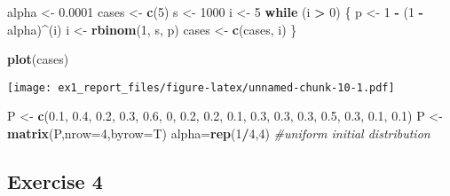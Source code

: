 \documentclass[]{article}
\newenvironment{Shaded}{\begin{snugshade}}{\end{snugshade}}
\newcommand{\CommentTok}[1]{\textcolor[rgb]{0.56,0.35,0.01}{\textit{#1}}}
\newcommand{\ControlFlowTok}[1]{\textcolor[rgb]{0.13,0.29,0.53}{\textbf{#1}}}
\newcommand{\DataTypeTok}[1]{\textcolor[rgb]{0.13,0.29,0.53}{#1}}
\newcommand{\DecValTok}[1]{\textcolor[rgb]{0.00,0.00,0.81}{#1}}
\newcommand{\FloatTok}[1]{\textcolor[rgb]{0.00,0.00,0.81}{#1}}
\newcommand{\KeywordTok}[1]{\textcolor[rgb]{0.13,0.29,0.53}{\textbf{#1}}}
\newcommand{\NormalTok}[1]{#1}
\newcommand{\OperatorTok}[1]{\textcolor[rgb]{0.81,0.36,0.00}{\textbf{#1}}}
\newcommand{\StringTok}[1]{\textcolor[rgb]{0.31,0.60,0.02}{#1}}
\begin{document}
\begin{Shaded}
\begin{Highlighting}[]
\NormalTok{alpha <-}\StringTok{ }\FloatTok{0.0001}
\NormalTok{cases <-}\StringTok{ }\KeywordTok{c}\NormalTok{(}\DecValTok{5}\NormalTok{)}
\NormalTok{s <-}\StringTok{ }\DecValTok{1000}
\NormalTok{i <-}\StringTok{ }\DecValTok{5}
\ControlFlowTok{while}\NormalTok{ (i }\OperatorTok{>}\StringTok{ }\DecValTok{0}\NormalTok{) \{}
\NormalTok{    p <-}\StringTok{ }\DecValTok{1} \OperatorTok{-}\StringTok{ }\NormalTok{(}\DecValTok{1} \OperatorTok{-}\StringTok{ }\NormalTok{alpha)}\OperatorTok{^}\NormalTok{(i)}
\NormalTok{    i <-}\StringTok{ }\KeywordTok{rbinom}\NormalTok{(}\DecValTok{1}\NormalTok{, s, p)}
\NormalTok{    cases <-}\StringTok{ }\KeywordTok{c}\NormalTok{(cases, i)}
\NormalTok{\}}
\end{Highlighting}
\end{Shaded}

\begin{Shaded}
\begin{Highlighting}[]
\KeywordTok{plot}\NormalTok{(cases)}
\end{Highlighting}
\end{Shaded}

\texttt{[image: ex1\_report\_files/figure-latex/unnamed-chunk-10-1.pdf]}

\begin{Shaded}
\begin{Highlighting}[]
\NormalTok{P <-}\StringTok{ }\KeywordTok{c}\NormalTok{(}\FloatTok{0.1}\NormalTok{, }\FloatTok{0.4}\NormalTok{, }\FloatTok{0.2}\NormalTok{, }\FloatTok{0.3}\NormalTok{,}
       \FloatTok{0.6}\NormalTok{,   }\DecValTok{0}\NormalTok{, }\FloatTok{0.2}\NormalTok{, }\FloatTok{0.2}\NormalTok{,}
       \FloatTok{0.1}\NormalTok{, }\FloatTok{0.3}\NormalTok{, }\FloatTok{0.3}\NormalTok{, }\FloatTok{0.3}\NormalTok{,}
       \FloatTok{0.5}\NormalTok{, }\FloatTok{0.3}\NormalTok{, }\FloatTok{0.1}\NormalTok{, }\FloatTok{0.1}\NormalTok{)}
\NormalTok{P <-}\StringTok{ }\KeywordTok{matrix}\NormalTok{(P,}\DataTypeTok{nrow=}\DecValTok{4}\NormalTok{,}\DataTypeTok{byrow=}\NormalTok{T)}
\NormalTok{alpha=}\KeywordTok{rep}\NormalTok{(}\DecValTok{1}\OperatorTok{/}\DecValTok{4}\NormalTok{,}\DecValTok{4}\NormalTok{) }\CommentTok{#uniform initial distribution}
\end{Highlighting}
\end{Shaded}

\hypertarget{exercise-4}{%
\subsection{Exercise 4}\label{exercise-4}}
\end{document}
